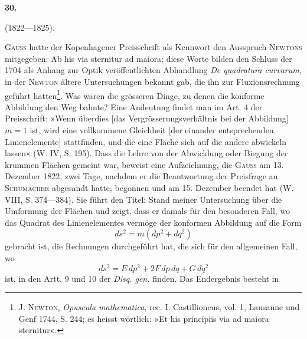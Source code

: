 \clearpage\begingroup{}
\renewcommand{\thefootnote}{\arabic{footnote})}\setcounter{footnote}{1}
\makeatletter\tagsleft@true\let\veqno\leqno\makeatother
\begin{center}
\textbf{30.}\par\smallskip
{}\par
{} (1822—1825).
\end{center}
\noindent\hspace*{\parindent}\textsc{Gauss} hatte der Kopenhagener Preisschrift als Kennwort den Ausspruch
\textsc{Newtons} mitgegeben: Ab his via sternitur ad maiora; diese Worte bilden
den Schluss der 1704 als Anhang zur Optik veröffentlichten Abhandlung \textit{De
quadratura curvarum}, in der \textsc{Newton} ältere Untersuchungen bekannt gab, die
ihn zur Fluxionsrechnung geführt hatten\footnote{\textsc{J. Newton}, \textit{Opuscula mathematica}, rec. I. Castillioneus, vol. 1, Lausanne und Genf 1744, S. 244; es heisst wörtlich: »Et his principiis via ad maiora sternitur«.}.
\clearpage{}\setcounter{footnote}{0}
\indent Was waren die grösseren Dinge, zu denen die konforme Abbildung den
Weg bahnte? Eine Andeutung findet man im Art. 4 der Preisschrift: »Wenn
überdies [das Vergrösserungsverhältnis bei der Abbildung] \(m=1\) ist, wird eine
vollkommene Gleichheit [der einander entsprechenden Linienelemente] stattfinden,
und die eine Fläche sich auf die andere abwickeln lassen« (W. IV,
S. 195). Dass die Lehre von der Abwicklung oder Biegung der krummen
Flächen gemeint war, beweist eine Aufzeichnung, die \textsc{Gauss} am 13. Dezember
1822, zwei Tage, nachdem er die Beantwortung der Preisfrage an \textsc{Schumacher}
abgesandt hatte, begonnen und am 15. Dezember beendet hat (W. VIII,
S. 374—384). Sie führt den Titel: Stand meiner Untersuchung über die
Umformung der Flächen und zeigt, dass er damals für den besonderen Fall,
wo das Quadrat des Linienelementes vermöge der konformen Abbildung auf
die Form
\begin{equation}ds^2=m(dp^2+dq^2)\tag{1}\end{equation}
\noindent gebracht ist, die Rechnungen durchgeführt hat, die sich für den allgemeinen
Fall, wo
\begin{equation}ds^2=E\,dp^2+2F\,dp\,dq+G\,dq^2\tag{2}\end{equation}
\noindent ist, in den Artt. 9 und 10 der \textit{Disq. gen.} finden. Das Endergebnis besteht in

